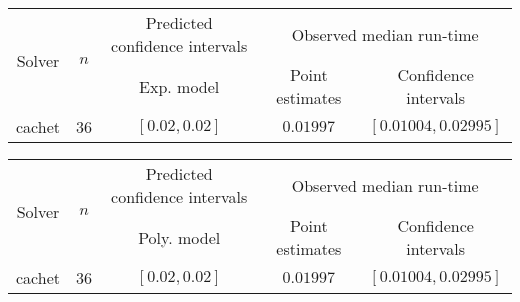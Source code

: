 \begin{tabular}{ccccc}
\hline 
\multirow{2}{*}{Solver} & \multirow{2}{*}{$n$} & Predicted confidence intervals & \multicolumn{2}{c}{Observed median  run-time}\tabularnewline
 &  & Exp. model  & Point estimates  & Confidence intervals\tabularnewline
\hline 
\hline 
\multirow{0}{*}{cachet} & 36 & $\mathbf{\left[0.02,0.02\right]}$ & $0.01997$ & $\left[0.01004,0.02995\right]$ \tabularnewline 
\hline 
\end{tabular} 

\begin{tabular}{ccccc}
\hline 
\multirow{2}{*}{Solver} & \multirow{2}{*}{$n$} & Predicted confidence intervals & \multicolumn{2}{c}{Observed median  run-time}\tabularnewline
 &  & Poly. model  & Point estimates  & Confidence intervals\tabularnewline
\hline 
\hline 
\multirow{0}{*}{cachet} & 36 & $\mathbf{\left[0.02,0.02\right]}$ & $0.01997$ & $\left[0.01004,0.02995\right]$ \tabularnewline 
\hline 
\end{tabular} 


